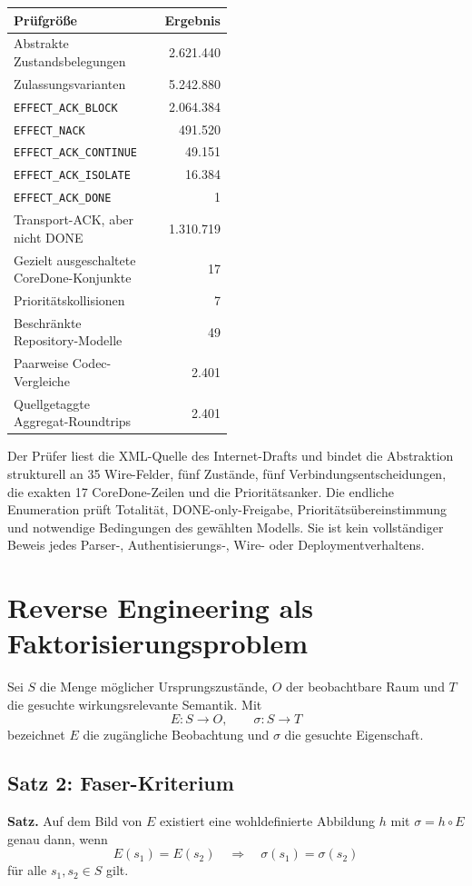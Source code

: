\documentclass[11pt,a4paper]{article}
\newcommand{\DONE}{\texttt{EFFECT\_ACK\_DONE}}
\newcommand{\CONTINUE}{\texttt{EFFECT\_ACK\_CONTINUE}}
\newcommand{\BLOCK}{\texttt{EFFECT\_ACK\_BLOCK}}
\newcommand{\ISOLATE}{\texttt{EFFECT\_ACK\_ISOLATE}}
\newcommand{\NACK}{\texttt{EFFECT\_NACK}}
\begin{document}
\begin{longtable}{@{}p{0.48\linewidth}r@{}}
\toprule
\textbf{Prüfgröße} & \textbf{Ergebnis} \\
\midrule
\endhead
Abstrakte Zustandsbelegungen & 2.621.440 \\
Zulassungsvarianten & 5.242.880 \\
\BLOCK & 2.064.384 \\
\NACK & 491.520 \\
\CONTINUE & 49.151 \\
\ISOLATE & 16.384 \\
\DONE & 1 \\
Transport-ACK, aber nicht DONE & 1.310.719 \\
Gezielt ausgeschaltete CoreDone-Konjunkte & 17 \\
Prioritätskollisionen & 7 \\
Beschränkte Repository-Modelle & 49 \\
Paarweise Codec-Vergleiche & 2.401 \\
Quellgetaggte Aggregat-Roundtrips & 2.401 \\
\bottomrule
\end{longtable}

Der Prüfer liest die XML-Quelle des Internet-Drafts und bindet die Abstraktion
strukturell an 35 Wire-Felder, fünf Zustände, fünf
Verbindungsentscheidungen, die exakten 17 CoreDone-Zeilen und die
Prioritätsanker. Die endliche Enumeration prüft Totalität,
DONE-only-Freigabe, Prioritätsübereinstimmung und notwendige Bedingungen des
gewählten Modells. Sie ist kein vollständiger Beweis jedes Parser-,
Authentisierungs-, Wire- oder Deploymentverhaltens.

\section{Reverse Engineering als Faktorisierungsproblem}

Sei $S$ die Menge möglicher Ursprungszustände, $O$ der beobachtbare Raum und
$T$ die gesuchte wirkungsrelevante Semantik. Mit
\[
E:S\to O,\qquad \sigma:S\to T
\]
bezeichnet $E$ die zugängliche Beobachtung und $\sigma$ die gesuchte
Eigenschaft.

\subsection{Satz 2: Faser-Kriterium}

\textbf{Satz.} Auf dem Bild von $E$ existiert eine wohldefinierte Abbildung
$h$ mit $\sigma=h\circ E$ genau dann, wenn
\[
E(s_1)=E(s_2)\quad\Longrightarrow\quad\sigma(s_1)=\sigma(s_2)
\]
für alle $s_1,s_2\in S$ gilt.
\end{document}
